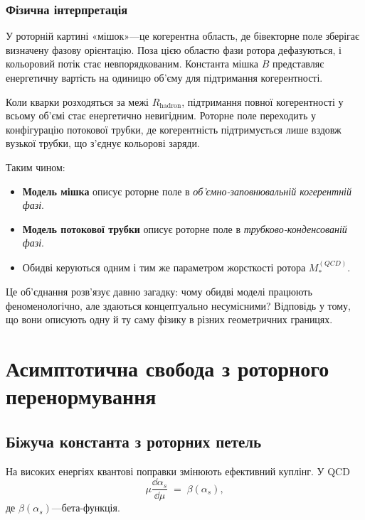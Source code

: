 \documentclass[11pt,a4paper]{article}
\theoremstyle{definition}
\theoremstyle{plain}
\theoremstyle{remark}
\begin{document}
\subsubsection{Фізична інтерпретація}

У роторній картині «мішок»—це когерентна область, де бівекторне поле зберігає визначену фазову орієнтацію. Поза цією областю фази ротора дефазуються, і кольоровий потік стає невпорядкованим. Константа мішка $B$ представляє енергетичну вартість на одиницю об'єму для підтримання когерентності.

Коли кварки розходяться за межі $R_{\mathrm{hadron}}$, підтримання повної когерентності у всьому об'ємі стає енергетично невигідним. Роторне поле переходить у конфігурацію потокової трубки, де когерентність підтримується лише вздовж вузької трубки, що з'єднує кольорові заряди.

Таким чином:
\begin{itemize}[leftmargin=*,itemsep=3pt]
  \item \textbf{Модель мішка} описує роторне поле в \emph{об'ємно-заповнювальній когерентній фазі}.
  \item \textbf{Модель потокової трубки} описує роторне поле в \emph{трубково-конденсованій фазі}.
  \item Обидві керуються одним і тим же параметром жорсткості ротора $M_*^{(QCD)}$.
\end{itemize}

Це об'єднання розв'язує давню загадку: чому обидві моделі працюють феноменологічно, але здаються концептуально несумісними? Відповідь у тому, що вони описують одну й ту саму фізику в різних геометричних границях.

\vspace{1em}

\section{Асимптотична свобода з роторного перенормування}
\label{sec:asymptotic-freedom}

\subsection{Біжуча константа з роторних петель}

На високих енергіях квантові поправки змінюють ефективний куплінг. У QCD
\begin{equation}
\mu \frac{\dd\alpha_s}{\dd\mu} \;=\; \beta(\alpha_s),
\label{eq:rge}
\end{equation}
де $\beta(\alpha_s)$—бета-функція.
\end{document}
